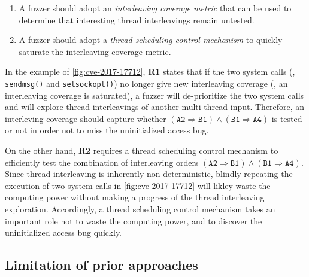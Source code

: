 \vspace{0.4em}
\begin{enumerate}[label=\textbf{R\arabic*:}]
%
\item A fuzzer should adopt an \textit{interleaving coverage metric}
  that can be used to determine that interesting thread interleavings
  remain untested.
\item A fuzzer should adopt a \textit{thread scheduling control
    mechanism} to quickly saturate the interleaving coverage metric.
%
\end{enumerate}


In the example of \autoref{fig:cve-2017-17712}, \textbf{R1} states
that if the two system calls (\ie, \texttt{sendmsg()} and
\texttt{setsockopt()}) no longer give new interleaving coverage (\ie,
an interleaving coverage is saturated), a fuzzer will de-prioritize
the two system calls and will explore thread interleavings of another
multi-thread input.
%
Therefore, an interleving coverage should capture whether
$(\texttt{A2} \Rightarrow \texttt{B1}) \wedge (\texttt{B1} \Rightarrow
\texttt{A4})$ is tested or not in order not to miss the uninitialized
access bug.


On the other hand, \textbf{R2} requires a thread scheduling control
mechanism to efficiently test the combination of interleaving orders
$(\texttt{A2} \Rightarrow \texttt{B1}) \wedge (\texttt{B1} \Rightarrow
\texttt{A4})$.
%
Since thread interleaving is inherently non-deterministic, blindly
repeating the execution of two system calls in
\autoref{fig:cve-2017-17712} will likley waste the computing power
without making a progress of the thread interleaving exploration.
%
Accordingly, a thread scheduling control mechanism takes an important
role not to waste the computing power, and to discover the
uninitialized access bug quickly.




%


\subsection{Limitation of prior approaches}
\label{ss:existingapproaches}

\begin{table}[t]
  \centering
  
  \caption{Recent fuzzing works to discover concurrency bugs in the
    kernel, and their concurrency coverage metrics (\textbf{R1}) and
    thread scheduling control mechanisms (\textbf{R2}). ``--''
    indicates that a fuzzer does not adopt a concurrency coverage
    metric.
    }
  \label{table:motivation}
\end{table}

